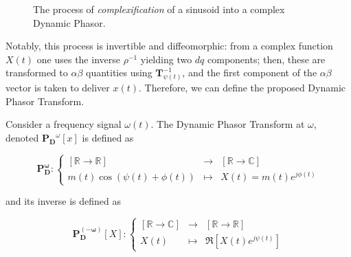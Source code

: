 \begin{figure}[htb]
{
	}
	\caption{The process of \textit{complexification} of a sinusoid into a complex Dynamic Phasor.}
	\label{fig:complexification_process_dps}
\end{figure} %

	Notably, this process is invertible and diffeomorphic: from a complex function $X(t)$ one uses the inverse $\rho^{-1}$ yielding two $dq$ components; then, these are transformed to $\alpha\beta$ quantities using $\mathbf{T}^{-1}_{\psi(t)}$, and the first component of the $\alpha\beta$ vector is taken to deliver $x(t)$. Therefore, we can define the proposed Dynamic Phasor Transform.

\begin{definition}\label{def:dptransform}
	Consider a frequency signal $\omega(t)$. The Dynamic Phasor Transform at $\omega$, denoted $\mathbf{P_D}^\omega\left[x\right]$ is defined as 

\begin{equation} \mathbf{P_D^{\omega}}: \left\{\begin{array}{rcl} \left[\mathbb{R}\to\mathbb{R}\right] &\to& \left[\mathbb{R}\to\mathbb{C}\right] \\[3mm] m(t)\cos\left(\psi(t) + \phi(t)\right) &\mapsto& X(t) = m(t)e^{j\phi(t)} \end{array}\right. \end{equation}

	\noindent and its inverse is defined as

\begin{equation} \mathbf{P_D^{\left(-\omega\right)}}\left[X\right]: \left\{\begin{array}{rcl} \left[\mathbb{R}\to\mathbb{C}\right] &\to& \left[\mathbb{R}\to\mathbb{R}\right] \\[3mm] X(t) &\mapsto& \Re\left[X(t)e^{j\psi(t)}\right] \end{array}\right. \end{equation}

\end{definition}

